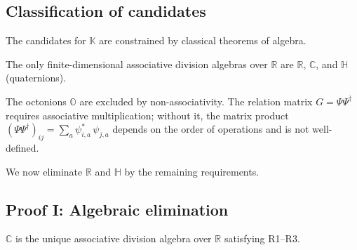 \subsection{Classification of candidates}

The candidates for $\mathbb{K}$ are constrained by classical theorems of algebra.

\begin{theorem}
The only finite-dimensional associative division algebras over $\mathbb{R}$ are $\mathbb{R}$, $\mathbb{C}$, and $\mathbb{H}$ (quaternions).
\end{theorem}

\begin{remark}
The octonions $\mathbb{O}$ are excluded by non-associativity. The relation matrix $G = \Psi\Psi^\dagger$ requires associative multiplication; without it, the matrix product $(\Psi\Psi^\dagger)_{ij} = \sum_a \psi^*_{i,a}\,\psi_{j,a}$ depends on the order of operations and is not well-defined.
\end{remark}

We now eliminate $\mathbb{R}$ and $\mathbb{H}$ by the remaining requirements.

\subsection{Proof I: Algebraic elimination}

\begin{theorem}
\label{thm:C_algebra}
$\mathbb{C}$ is the unique associative division algebra over $\mathbb{R}$ satisfying R1--R3.
\end{theorem}

